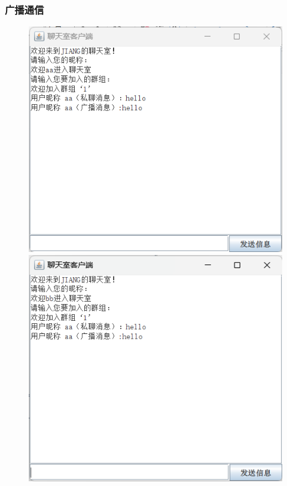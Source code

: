 \documentclass[UTF8,12pt]{article}
\begin{document}
\subsubsection{广播通信}
\begin{figure}[htbp]
	\centering
	\begin{minipage}{0.3\linewidth}
		\centering
		\includegraphics[width=0.9\linewidth]{img/12.png}
	\end{minipage}
	\begin{minipage}{0.3\linewidth}
		\centering
		\includegraphics[width=0.9\linewidth]{img/13.png}
	\end{minipage}
	\qquad
	

\end{figure}
\end{document}
